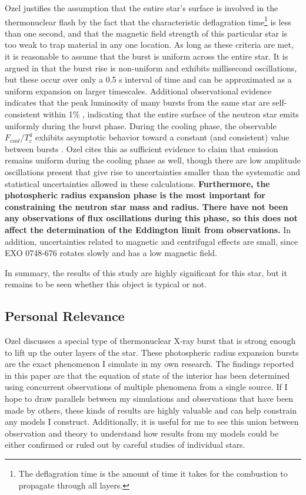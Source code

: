 \documentclass[onecolumn]{aastex63}
\begin{document}
Ozel justifies the assumption that the entire star's surface is involved in the thermonuclear flash by the fact that the characteristic deflagration time\footnote{The deflagration time is the amount of time it takes for the combustion to propagate through all layers.} is less than one second, and that the magnetic field strength of this particular star is too weak to trap material in any one location. As long as these criteria are met, it is reasonable to assume that the burst is uniform across the entire star. It is argued in \cite{strohmayer1997} that the burst rise is non-uniform and exhibits millisecond oscillations, but these occur over only a 0.5 s interval of time and can be approximated as a uniform expansion on larger timescales. Additional observational evidence indicates that the peak luminosity of many bursts from the same star are self-consistent within 1\% \citep{galloway2003}, indicating that the entire surface of the neutron star emits uniformly during the burst phase. During the cooling phase, the observable $F_{cool}/T_c^4$ exhibits asymptotic behavior toward a constant (and consistent) value between bursts \citep{damen1990}. Ozel cites this as sufficient evidence to claim that emission remains uniform during the cooling phase as well, though there are low amplitude oscillations present that give rise to uncertainties smaller than the systematic and statistical uncertainties allowed in these calculations. \textbf{Furthermore, the photospheric radius expansion phase is the most important for constraining the neutron star mass and radius. There have not been any observations of flux oscillations during this phase, so this does not affect the determination of the Eddington limit from observations.} In addition, uncertainties related to magnetic and centrifugal effects are small, since EXO 0748-676 rotates slowly and has a low magnetic field.

In summary, the results of this study are highly significant for this star, but it remains to be seen whether this object is typical or not.

\subsection{Personal Relevance}

Ozel discusses a special type of thermonuclear X-ray burst that is strong enough to lift up the outer layers of the star. These photospheric radius expansion bursts are the exact phenomenon I simulate in my own research. The findings reported in this paper are that the equation of state of the interior has been determined using concurrent observations of multiple phenomena from a single source. If I hope to draw parallels between my simulations and observations that have been made by others, these kinds of results are highly valuable and can help constrain any models I construct. Additionally, it is useful for me to see this union between observation and theory to understand how results from my models could be either confirmed or ruled out by careful studies of individual stars.
\end{document}
